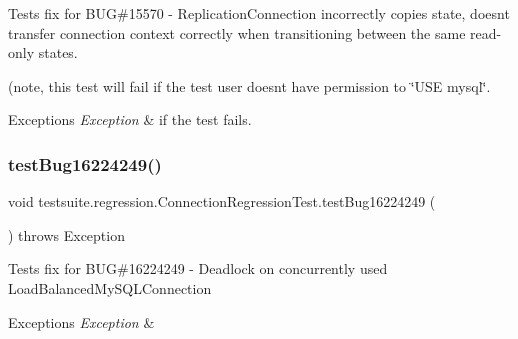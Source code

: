 Tests fix for B\+UG\#15570 -\/ Replication\+Connection incorrectly copies state, doesn\textquotesingle{}t transfer connection context correctly when transitioning between the same read-\/only states.

(note, this test will fail if the test user doesn\textquotesingle{}t have permission to \char`\"{}\+U\+S\+E \textquotesingle{}mysql\textquotesingle{}\char`\"{}.


\begin{DoxyExceptions}{Exceptions}
{\em Exception} & if the test fails. \\
\hline
\end{DoxyExceptions}
\mbox{\label{classtestsuite_1_1regression_1_1_connection_regression_test_a24c8f315d33aa8259b7777c43e225b24}} 
\subsubsection{\texorpdfstring{test\+Bug16224249()}{testBug16224249()}}
{\footnotesize\ttfamily void testsuite.\+regression.\+Connection\+Regression\+Test.\+test\+Bug16224249 (\begin{DoxyParamCaption}{ }\end{DoxyParamCaption}) throws Exception}

Tests fix for B\+UG\#16224249 -\/ Deadlock on concurrently used Load\+Balanced\+My\+S\+Q\+L\+Connection


\begin{DoxyExceptions}{Exceptions}
{\em Exception} & \\
\hline
\end{DoxyExceptions}
\mbox{\label{classtestsuite_1_1regression_1_1_connection_regression_test_a93aad983034e220127a84017e297d492}} 
